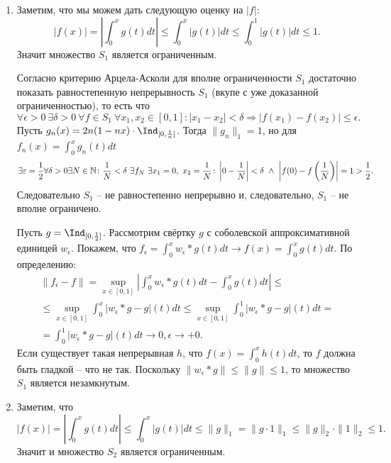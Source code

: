 \begin{solve}
    \leavevmode
    \begin{enumerate}
        \item Заметим, что мы можем дать следующую оценку на $|f|\colon$
        \[
            |f(x)| = \left|\int_0^x g(t)dt\right| \leq \int_0^x |g(t)|dt \leq \int_0^1 |g(t)|dt \leq 1.
        \]
        Значит множество $S_1$ является ограниченным.

        Согласно критерию Арцела-Асколи для вполне ограниченности $S_1$ достаточно показать равностепенную непрерывность $S_1$ (вкупе с уже доказанной ограниченностью), то есть что
        \[
            \forall \epsilon > 0 \ \exists \delta > 0 \ \forall f \in S_1 \ \forall x_1, x_2 \in [0, 1]\colon |x_1 - x_2| < \delta \Rightarrow |f(x_1) - f(x_2)| \leq \epsilon.
        \]
        Пусть $g_n(x) = 2n(1 - nx) \cdot \Ind_{[0, \frac{1}{n}]}$. Тогда $\|g_n\|_1 = 1$, но для $f_n(x) = \int_0^x g_n(t)dt$
        \[
            \exists \varepsilon = \frac{1}{2} \forall \delta > 0 \exists N \in \mathbb{N}\colon \frac{1}{N} < \delta \ \exists f_N \ \exists x_1 = 0, \ x_2 = \frac{1}{N}\colon \left|0 - \frac{1}{N}\right| < \delta \ \wedge \ \left|f(0) - f\left(\frac{1}{N}\right)\right| = 1 > \frac{1}{2}.
        \]
        Следовательно $S_1$ -- не равностепенно непрерывно и, следовательно, $S_1$ -- не вполне ограничено.

        Пусть $g = \Ind_{[0, \frac{1}{2}]}$. Рассмотрим свёртку $g$ с соболевской аппроксимативной единицей $w_\epsilon$. Покажем, что $f_\epsilon = \int_0^x w_\epsilon * g(t)dt \rightarrow f(x) = \int_0^x g(t)dt$. По определению:
        \begin{multline*}
            \|f_\epsilon - f\| = \sup\limits_{x \in [0, 1]} \left|\int_0^x w_\epsilon * g(t)dt - \int_0^x g(t)dt\right| \leq \\ \leq
            \sup_{x \in [0, 1]}\int_0^x|w_\epsilon * g - g|(t)dt \leq \sup\limits_{x \in [0, 1]} \int_0^1 |w_\epsilon * g - g|(t)dt = \\ = \int_0^1 |w_\epsilon * g - g|(t)dt \rightarrow 0, \epsilon \rightarrow +0.
        \end{multline*}
        Если существует такая непрерывная $h$, что $f(x) = \int_0^x h(t)dt$, то $f$ должна быть гладкой -- что не так. Поскольку $\|w_\epsilon * g\| \leq \|g\| \leq 1$, то множество $S_1$ является незамкнутым.
        \item Заметим, что
        \[
            |f(x)| = \left|\int_0^x g(t)dt\right| \leq \int_0^x |g(t)|dt \leq \|g\|_1 = \|g \cdot 1\|_1 \leq \|g\|_2 \cdot \|1\|_2 \leq 1.
        \]
        Значит и множество $S_2$ является ограниченным.


\end{enumerate}
\end{solve}
